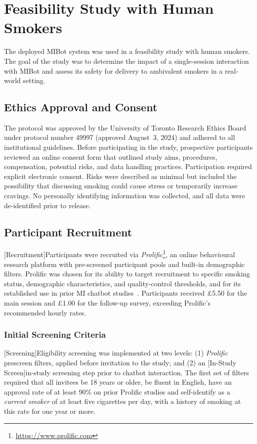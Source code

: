 \section{Feasibility Study with Human Smokers}
\label{sec:feasibility}
The deployed MIBot system was used in a feasibility study with human smokers. The goal of the study was to determine the impact of a single-session interaction with MIBot and assess its safety for delivery to ambivalent smokers in a real-world setting.

\subsection{Ethics Approval and Consent}
The protocol was approved by the University of Toronto Research Ethics Board under protocol number 49997 (approved August~3, 2024) and adhered to all institutional guidelines. Before participating in the study, prospective participants reviewed an online consent form that outlined study aims, procedures, compensation, potential risks, and data handling practices. Participation required explicit electronic consent. Risks were described as minimal but included the possibility that discussing smoking could cause stress or temporarily increase cravings. No personally identifying information was collected, and all data were de-identified prior to release.

\subsection{Participant Recruitment}
\label{sec:recruitment}
[Recruitment]Participants were recruited via \textit{Prolific}\footnote{\url{https://www.prolific.com}}, an online behavioural research platform with pre-screened participant pools and built-in demographic filters. Prolific was chosen for its ability to target recruitment to specific smoking status, demographic characteristics, and quality-control thresholds, and for its established use in prior MI chatbot studies~\citep{brown2023motivational,info:doi/10.2196/20251}. Participants received \pounds5.50 for the main session and \pounds1.00 for the follow-up survey, exceeding Prolific's recommended hourly rates.


\subsubsection{Initial Screening Criteria}
[Screening]Eligibility screening was implemented at two levels: (1) \textit{Prolific} prescreen filters, applied before invitation to the study; and (2) an [In-Study Screen]in-study screening step prior to chatbot interaction. The first set of filters required that all invitees be 18 years or older, be fluent in English, have an approval rate of at least 90\% on prior Prolific studies and self-identify as a \emph{current smoker} of at least five cigarettes per day, with a history of smoking at this rate for one year or more.

